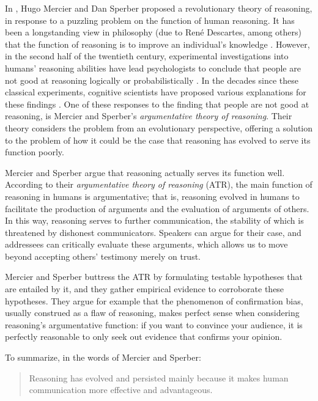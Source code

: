 
In \citeyear{MS11}, Hugo Mercier and Dan Sperber proposed a revolutionary
theory of reasoning, in response to a puzzling problem on the function of human reasoning.
It has been a longstanding view in philosophy (due to René Descartes, among others) that the function of reasoning is to improve an individual's knowledge \citep{Schouls72, Walter51}.
However, in the second half of the twentieth century, experimental investigations into humans' reasoning abilities have lead psychologists to conclude that people are not good at reasoning logically \citep{Wason68} or probabilistically \citep{Tversky83}.
In the decades since these classical experiments, cognitive scientists have proposed various explanations for these findings \citep[e.g.]{Cosmides89, Oaksford94, Hertwig99}.
One of these responses to the finding that people are not good at reasoning, is Mercier and Sperber's \emph{argumentative theory of reasoning}.
Their theory considers the problem from an evolutionary perspective, offering a solution to the problem of how it could be the case that reasoning has evolved to serve its function poorly.

Mercier and Sperber argue that reasoning actually serves its function well.
According to their \emph{argumentative theory of reasoning} (ATR), the main function of reasoning in humans is argumentative; that is, reasoning evolved in humans to facilitate the production of arguments and the evaluation of arguments of others. In this way, reasoning serves to further communication, the stability of which is threatened by dishonest communicators. Speakers can argue for their case, and addressees can critically evaluate these arguments, which allows us to move beyond accepting others' testimony merely on trust.

Mercier and Sperber buttress the ATR by formulating testable hypotheses that are entailed by it, and they gather empirical evidence to corroborate these hypotheses. They argue for example that the phenomenon of confirmation bias, usually construed as a flaw of reasoning, makes perfect sense when considering reasoning's argumentative function: if you want to convince your audience, it is perfectly reasonable to only seek out evidence that confirms your opinion.

To summarize, in the words of Mercier and Sperber:
\begin{quote}
    Reasoning has evolved and persisted mainly because it makes human communication more effective and advantageous.
    \citep[p.~60]{MS11}
\end{quote}

